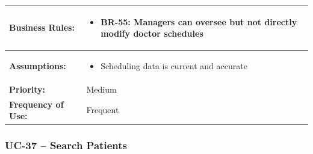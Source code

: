 \documentclass[12pt,a4paper]{article}
\begin{document}
\begin{longtable}{|p{4.5cm}|p{10.5cm}|}
\hline
\textbf{Business Rules:} &
\begin{itemize}
  \item BR-55: Managers can oversee but not directly modify doctor schedules
\end{itemize} \\
\hline
\textbf{Assumptions:} &
\begin{itemize}
  \item Scheduling data is current and accurate
\end{itemize} \\
\hline
\textbf{Priority:} & Medium \\
\hline
\textbf{Frequency of Use:} & Frequent \\
\hline
\end{longtable}

\subsubsection{UC-37 – Search Patients}
\end{document}
